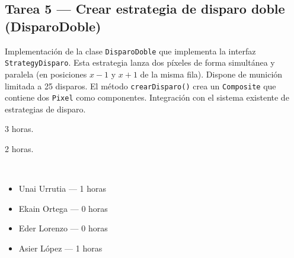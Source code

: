 \documentclass[12pt, a4paper]{article}
\begin{document}
\subsection*{Tarea 5 — Crear estrategia de disparo doble (DisparoDoble)}
\begin{description}[leftmargin=2em, style=nextline]
    \item[\textbf{Descripción:}] Implementación de la clase \texttt{DisparoDoble} que implementa la interfaz \texttt{StrategyDisparo}. Esta estrategia lanza dos píxeles de forma simultánea y paralela (en posiciones $x-1$ y $x+1$ de la misma fila). Dispone de munición limitada a 25 disparos. El método \texttt{crearDisparo()} crea un \texttt{Composite} que contiene dos \texttt{Pixel} como componentes. Integración con el sistema existente de estrategias de disparo.
    \item[\textbf{Tiempo estimado:}] 3 horas.
    \item[\textbf{Tiempo real:}] 2 horas.
    \item[\textbf{Responsables y dedicación:}]~
        \begin{itemize}[leftmargin=1em, nosep]
            \item Unai Urrutia — 1 horas
            \item Ekain Ortega — 0 horas
            \item Eder Lorenzo — 0 horas
            \item Asier López — 1 horas
        \end{itemize}
\end{description}

\vspace{0.8em}

\end{document}
